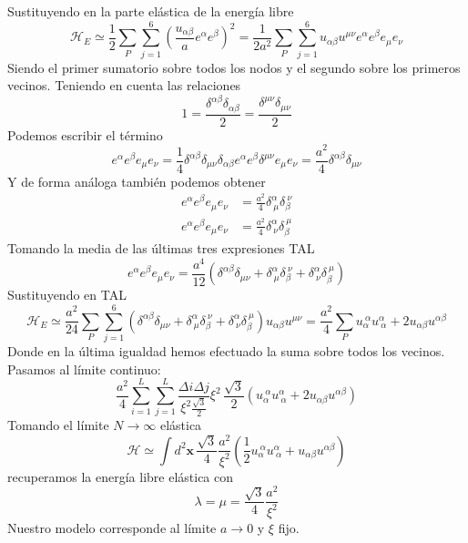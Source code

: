 Sustituyendo en la parte elástica de la energía libre
\begin{equation}
\mathcal{H}_E\simeq \frac{1}{2}\sum_{P} \sum^6_{j=1} \left(\frac{u_{\alpha\beta}}{a}e^{\alpha}e^{\beta}\right)^2=\frac{1}{2a^2}\sum_{P} \sum^6_{j=1} u_{\alpha\beta}u^{\mu\nu}e^{\alpha}e^{\beta}e_{\mu}e_{\nu}
\end{equation}
Siendo el primer sumatorio sobre todos los nodos y el segundo sobre los
primeros vecinos. Teniendo en cuenta las relaciones
\begin{equation}
1=\frac{\delta^{\alpha\beta}\delta_{\alpha\beta}}{2}=\frac{\delta^{\mu\nu}\delta_{\mu\nu}}{2}
\end{equation}
Podemos escribir el término
\begin{equation}
e^{\alpha}e^{\beta}e_{\mu}e_{\nu}=\frac{1}{4}\delta^{\alpha\beta}\delta_{\mu\nu}\delta_{\alpha\beta}e^{\alpha}e^{\beta}\delta^{\mu\nu}e_{\mu}e_{\nu}=\frac{a^2}{4}\delta^{\alpha\beta}\delta_{\mu\nu}
\end{equation}
Y de forma análoga también podemos obtener
\begin{align}
e^{\alpha}e^{\beta}e_{\mu}e_{\nu}&=\frac{a^2}{4}\delta^{\alpha}_{\ \mu}\delta_{\beta}^{\
  \nu}\\
e^{\alpha}e^{\beta}e_{\mu}e_{\nu}&=\frac{a^2}{4}\delta^{\alpha}_{\ \nu}\delta_{\beta}^{\
  \mu}
\end{align}
Tomando la media de las últimas tres expresiones TAL
\begin{equation}
e^{\alpha}e^{\beta}e_{\mu}e_{\nu}=\frac{a^4}{12}(\delta^{\alpha\beta}\delta_{\mu\nu}+
\delta^{\alpha}_{\ \mu}\delta_{\beta}^{\ \nu}+
\delta^{\alpha}_{\ \nu}\delta_{\beta}^{\ \mu})
\end{equation}
Sustituyendo en TAL
\begin{equation}
\mathcal{H}_E\simeq\frac{a^2}{24}\sum_{P} \sum^6_{j=1}(\delta^{\alpha\beta}\delta_{\mu\nu}+\delta^{\alpha}_{\ \mu}\delta_{\beta}^{\ \nu}+
\delta^{\alpha}_{\ \nu}\delta_{\beta}^{\ \mu})
u_{\alpha\beta}u^{\mu\nu}=\frac{a^2}{4}\sum_{P}u_{\alpha}^{\ \alpha}u^{\alpha}_{\ \alpha}+2u_{\alpha\beta}u^{\alpha\beta}
\end{equation}
Donde en  la última igualdad hemos efectuado la suma sobre todos los vecinos.
Pasamos al límite continuo:
\begin{equation}
\frac{a^2}{4}\sum_{i=1}^L\sum_{j=1}^L\frac{\Delta i\Delta j}{\xi^2\frac{\sqrt{3}}{2}}\xi^2\,\frac{\sqrt{3}}{2}(u_{\alpha}^{\ \alpha}u^{\alpha}_{\ \alpha}+2u_{\alpha\beta}u^{\alpha\beta})
\end{equation}
Tomando el límite $N\rightarrow \infty$
elástica 
\begin{equation}
\mathcal{H}\simeq\int d^2\mathbf{x}\, \frac{\sqrt{3}}{4}\frac{a^2}{\xi^2}\left(\frac{1}{2}u_{\alpha}^{\ \alpha}u^{\alpha}_{\ \alpha}+u_{\alpha\beta}u^{\alpha\beta}\right)
\end{equation}
recuperamos la energía libre elástica con 
\begin{equation}
\lambda=\mu=\frac{\sqrt{3}}{4}\frac{a^2}{\xi^2}
\end{equation}
Nuestro modelo corresponde al límite $a\rightarrow 0$ y $\xi$ fijo.


